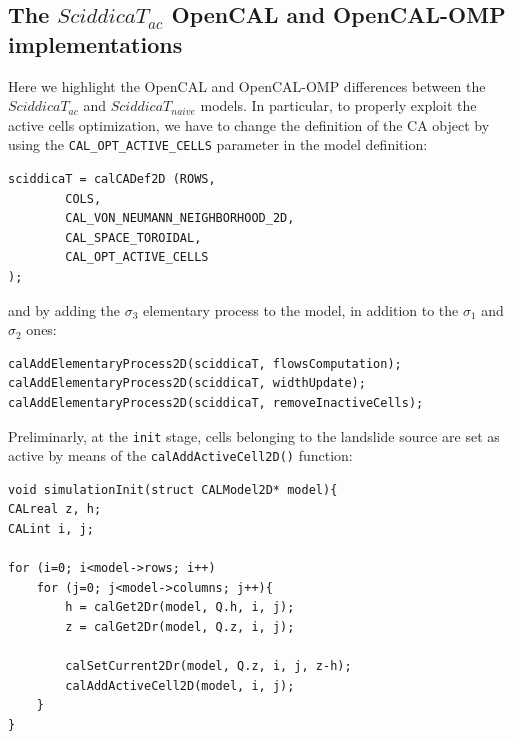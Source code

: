 \subsection{The $SciddicaT_{ac}$ OpenCAL and OpenCAL-OMP implementations}
Here we highlight the OpenCAL and OpenCAL-OMP differences between the $SciddicaT_{ac}$ and $SciddicaT_{naive}$ models. In particular, to properly exploit the active cells optimization, we have to change the definition of the CA object by using the \verb'CAL_OPT_ACTIVE_CELLS' parameter in the model
definition:
\begin{lstlisting}
sciddicaT = calCADef2D (ROWS,
		COLS,
		CAL_VON_NEUMANN_NEIGHBORHOOD_2D,
		CAL_SPACE_TOROIDAL,
		CAL_OPT_ACTIVE_CELLS
);
\end{lstlisting}

\noindent and by adding the $\sigma_3$ elementary process to the
model, in addition to the $\sigma_1$ and $\sigma_2$ ones:

\begin{lstlisting}
calAddElementaryProcess2D(sciddicaT, flowsComputation);
calAddElementaryProcess2D(sciddicaT, widthUpdate);
calAddElementaryProcess2D(sciddicaT, removeInactiveCells);
\end{lstlisting}

Preliminarly, at the \texttt{init} stage, cells belonging to the landslide
source are set as active by means of the
\verb'calAddActiveCell2D()' function:
\begin{lstlisting}
void simulationInit(struct CALModel2D* model){        
CALreal z, h;
CALint i, j;

for (i=0; i<model->rows; i++)
	for (j=0; j<model->columns; j++){
		h = calGet2Dr(model, Q.h, i, j);
		z = calGet2Dr(model, Q.z, i, j);

		calSetCurrent2Dr(model, Q.z, i, j, z-h);
		calAddActiveCell2D(model, i, j);
	}
}
\end{lstlisting}

